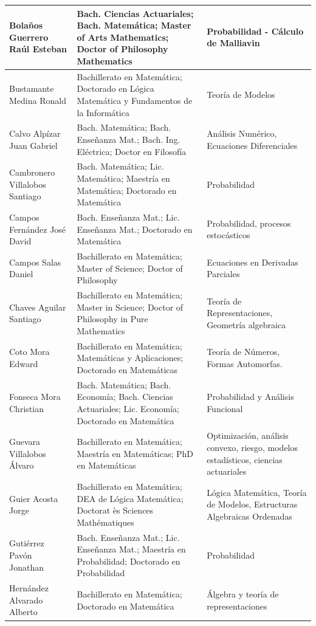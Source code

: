 \begin{landscape}
\begin{longtable}{|>{\raggedright\arraybackslash}p{5cm}|>{\raggedright\arraybackslash}p{9.8cm}|>{\raggedright\arraybackslash}p{5.6cm}|}
\hline
Bolaños Guerrero Raúl Esteban & Bach. Ciencias Actuariales; Bach. Matemática; Master of Arts Mathematics; Doctor of Philosophy Mathematics & Probabilidad - Cálculo de Malliavin \\
\hline
Bustamante Medina Ronald & Bachillerato en Matemática; Doctorado en Lógica Matemática y Fundamentos de la Informática & Teoría de Modelos \\
\hline
Calvo Alpízar Juan Gabriel & Bach. Matemática; Bach. Enseñanza Mat.; Bach. Ing. Eléctrica; Doctor en Filosofía & Análisis Numérico, Ecuaciones Diferenciales \\
\hline
Cambronero Villalobos Santiago & Bach. Matemática; Lic. Matemática; Maestría en Matemática; Doctorado en Matemática & Probabilidad \\
\hline
Campos Fernández José David & Bach. Enseñanza Mat.; Lic. Enseñanza Mat.; Doctorado en Matemática & Probabilidad, procesos estocásticos \\
\hline
Campos Salas Daniel & Bachillerato en Matemática; Master of Science; Doctor of Philosophy & Ecuaciones en Derivadas Parciales \\
\hline
Chaves Aguilar Santiago & Bachillerato en Matemática; Master in Science; Doctor of Philosophy in Pure Mathematics & Teoría de Representaciones, Geometría algebraica \\
\hline
Coto Mora Edward & Bachillerato en Matemática; Matemáticas y Aplicaciones; Doctorado en Matemáticas & Teoría de Números, Formas Automorfas. \\
\hline
Fonseca Mora Christian & Bach. Matemática; Bach. Economía; Bach. Ciencias Actuariales; Lic. Economía; Doctorado en Matemática & Probabilidad y Análisis Funcional \\
\hline
Guevara Villalobos Álvaro & Bachillerato en Matemática; Maestría en Matemáticas; PhD en Matemáticas & Optimización, análisis convexo, riesgo, modelos estadísticos, ciencias actuariales \\
\hline
Guier Acosta Jorge & Bachillerato en Matemática; DEA de Lógica Matemática; Doctorat ès Sciences Mathématiques & Lógica Matemática, Teoría de Modelos, Estructuras Algebraicas Ordenadas \\
\hline
Gutiérrez Pavón Jonathan & Bach. Enseñanza Mat.; Lic. Enseñanza Mat.; Maestría en Probabilidad; Doctorado en Probabilidad & Probabilidad \\
\hline
Hernández Alvarado Alberto & Bachillerato en Matemática; Doctorado en Matemática & Álgebra y teoría de representaciones \\

\end{longtable}
\end{landscape}
